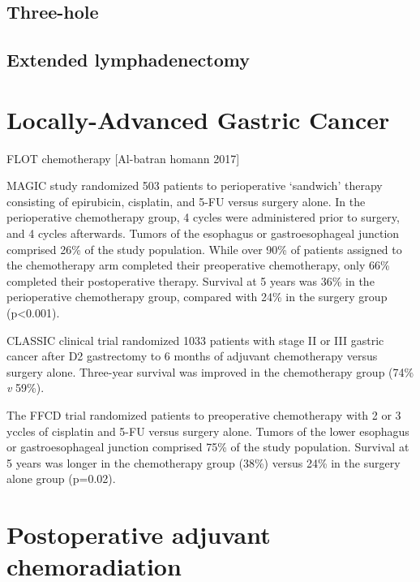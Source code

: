 \documentclass[
]{book}
\begin{document}
\hypertarget{three-hole-3}{%
\section{Three-hole}\label{three-hole-3}}

\hypertarget{extended-lymphadenectomy-3}{%
\section{Extended lymphadenectomy}\label{extended-lymphadenectomy-3}}

\hypertarget{locally-advanced-gastric-cancer}{%
\chapter{Locally-Advanced Gastric Cancer}\label{locally-advanced-gastric-cancer}}

FLOT chemotherapy {[}Al-batran homann 2017{]}

MAGIC study randomized 503 patients to perioperative `sandwich' therapy consisting of epirubicin, cisplatin, and 5-FU versus surgery alone. In the perioperative chemotherapy group, 4 cycles were administered prior to surgery, and 4 cycles afterwards. Tumors of the esophagus or gastroesophageal junction comprised 26\% of the study population. While over 90\% of patients assigned to the chemotherapy arm completed their preoperative chemotherapy, only 66\% completed their postoperative therapy. Survival at 5 years was 36\% in the perioperative chemotherapy group, compared with 24\% in the surgery group (p\textless0.001).\citep{cunningham11}

CLASSIC clinical trial randomized 1033 patients with stage II or III gastric cancer after D2 gastrectomy to 6 months of adjuvant chemotherapy versus surgery alone. Three-year survival was improved in the chemotherapy group (74\% \emph{v} 59\%).\citep{bang315}

The FFCD trial randomized patients to preoperative chemotherapy with 2 or 3 yccles of cisplatin and 5-FU versus surgery alone. Tumors of the lower esophagus or gastroesophageal junction comprised 75\% of the study population. Survival at 5 years was longer in the chemotherapy group (38\%) versus 24\% in the surgery alone group (p=0.02).\citep{ychou1715}

\hypertarget{postoperative-adjuvant-chemoradiation}{%
\chapter{Postoperative adjuvant chemoradiation}\label{postoperative-adjuvant-chemoradiation}}
\end{document}
